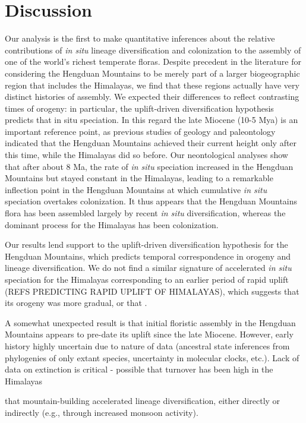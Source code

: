 \section{Discussion}

Our analysis is the first to make quantitative inferences about the relative contributions of \textit{in situ} lineage diversification and colonization to the assembly of one of the world's richest temperate floras. Despite precedent in the literature for considering the Hengduan Mountains to be merely part of a larger biogeographic region that includes the Himalayas, we find that these regions actually have very distinct histories of assembly. We expected their differences to reflect contrasting times of orogeny: in particular, the uplift-driven diversification hypothesis predicts that in situ speciation. In this regard the late Miocene (10-5 Mya) is an important reference point, as previous studies of geology and paleontology indicated that the Hengduan Mountains achieved their current height only after this time, while the Himalayas did so before. Our neontological analyses show that after about 8 Ma, the rate of \textit{in situ} speciation increased in the Hengduan Mountains but stayed constant in the Himalayas, leading to a remarkable inflection point in the Hengduan Mountains at which cumulative \textit{in situ} speciation overtakes colonization. It thus appears that the Hengduan Mountains flora has been assembled largely by recent \textit{in situ} diversification, whereas the dominant process for the Himalayas has been colonization.

Our results lend support to the uplift-driven diversification hypothesis for the Hengduan Mountains, which predicts temporal correspondence in orogeny and lineage diversification. We do not find a similar signature of accelerated \textit{in situ} speciation for the Himalayas corresponding to an earlier period of rapid uplift (REFS PREDICTING RAPID UPLIFT OF HIMALAYAS), which suggests that its orogeny was more gradual, or that .

A somewhat unexpected result is that initial floristic assembly in the Hengduan Mountains appears to pre-date its uplift since the late Miocene. However, early history highly uncertain due to nature of data (ancestral state inferences from phylogenies of only extant species, uncertainty in molecular clocks, etc.). Lack of data on extinction is critical - possible that turnover has been high in the Himalayas

that mountain-building accelerated lineage diversification, either directly or indirectly (e.g., through increased monsoon activity).



